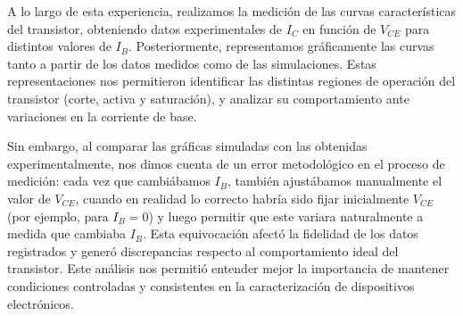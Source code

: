     \begin{figure}[H]
      \centering
    \end{figure}


  A lo largo de esta experiencia, realizamos la medición de las curvas características del transistor, obteniendo datos
  experimentales de $I_C$ en función de $V_{CE}$ para distintos valores de $I_B$. Posteriormente, representamos
  gráficamente las curvas tanto a partir de los datos medidos como de las simulaciones. Estas representaciones nos
  permitieron identificar las distintas regiones de operación del transistor (corte, activa y saturación), y analizar su
  comportamiento ante variaciones en la corriente de base.

  Sin embargo, al comparar las gráficas simuladas con las obtenidas experimentalmente, nos dimos cuenta de un error
  metodológico en el proceso de medición: cada vez que cambiábamos $I_B$, también ajustábamos manualmente el valor de
  $V_{CE}$, cuando en realidad lo correcto habría sido fijar inicialmente $V_{CE}$ (por ejemplo, para $I_B = 0$) y luego
  permitir que este variara naturalmente a medida que cambiaba $I_B$. Esta equivocación afectó la fidelidad de los datos
  registrados y generó discrepancias respecto al comportamiento ideal del transistor. Este análisis nos permitió
  entender mejor la importancia de mantener condiciones controladas y consistentes en la caracterización de dispositivos
  electrónicos.
